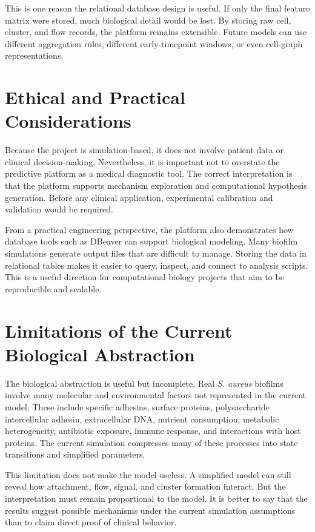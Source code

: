\documentclass[12pt,a4paper,oneside]{report}
\begin{document}
This is one reason the relational database design is useful. If only the final feature matrix were stored, much biological detail would be lost. By storing raw cell, cluster, and flow records, the platform remains extensible. Future models can use different aggregation rules, different early-timepoint windows, or even cell-graph representations.

\section{Ethical and Practical Considerations}
Because the project is simulation-based, it does not involve patient data or clinical decision-making. Nevertheless, it is important not to overstate the predictive platform as a medical diagnostic tool. The correct interpretation is that the platform supports mechanism exploration and computational hypothesis generation. Before any clinical application, experimental calibration and validation would be required.

From a practical engineering perspective, the platform also demonstrates how database tools such as DBeaver can support biological modeling. Many biofilm simulations generate output files that are difficult to manage. Storing the data in relational tables makes it easier to query, inspect, and connect to analysis scripts. This is a useful direction for computational biology projects that aim to be reproducible and scalable.


\section{Limitations of the Current Biological Abstraction}
The biological abstraction is useful but incomplete. Real \textit{S. aureus} biofilms involve many molecular and environmental factors not represented in the current model. These include specific adhesins, surface proteins, polysaccharide intercellular adhesin, extracellular DNA, nutrient consumption, metabolic heterogeneity, antibiotic exposure, immune response, and interactions with host proteins. The current simulation compresses many of these processes into state transitions and simplified parameters.

This limitation does not make the model useless. A simplified model can still reveal how attachment, flow, signal, and cluster formation interact. But the interpretation must remain proportional to the model. It is better to say that the results suggest possible mechanisms under the current simulation assumptions than to claim direct proof of clinical behavior.
\end{document}
